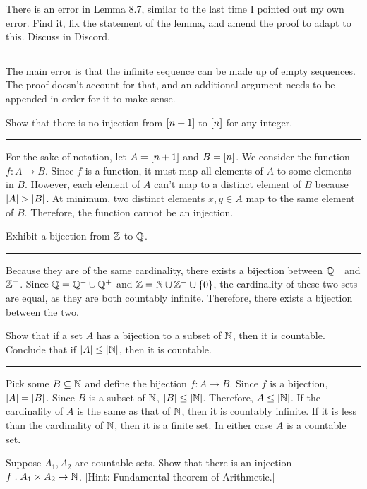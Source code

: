 \documentclass{article}
\begin{document}
\problem{}
There is an error in Lemma 8.7, similar to the last time I pointed out my own error.
Find it, fix the statement of the lemma, and amend the proof to adapt to this.
Discuss in Discord.

\hrule

The main error is that the infinite sequence can be made up of empty sequences.
The proof doesn't account for that, and an additional argument needs to be appended in order for it to make sense.

\problem{}

\subproblema{}

Show that there is no injection from $\left [ n+1 \right]$ to $\left [ n \right]$ for any integer.
\hrule

For the sake of notation, let $A = \left [ n+1 \right]$ and $B = \left [ n \right]$.
We consider the function $f : A \to B$.
Since $f$ is a function, it must map all elements of $A$ to some elements in $B$.
However, each element of $A$ can't map to a distinct element of $B$ because $\left\lvert A \right\rvert > \left\lvert B \right\rvert$.
At minimum, two distinct elements $x, y \in A$ map to the same element of $B$.
Therefore, the function cannot be an injection.

\problem{}

Exhibit a bijection from $\mathbb Z$ to $\mathbb Q$.

\hrule

Because they are of the same cardinality, there exists a bijection between $\mathbb Q^-$ and $\mathbb Z^-$.
Since $\mathbb Q = \mathbb Q^- \cup \mathbb Q^+$ and $\mathbb Z = \mathbb N \cup \mathbb Z^- \cup \left \{ 0 \right \}$, the cardinality of these two sets are equal, as they are both countably infinite.
Therefore, there exists a bijection between the two.

\problem{}

Show that if a set $A$ has a bijection to a subset of $\mathbb N$, then it is countable.
Conclude that if $\left\lvert A \right\rvert \leq \left\lvert\mathbb N \right\rvert$, then it is countable.

\hrule

Pick some $B \subseteq \mathbb N$ and define the bijection $f : A \to B$.
Since $f$ is a bijection, $\left\lvert A \right\rvert = \left\lvert B \right\rvert$.
Since $B$ is a subset of $\mathbb N$, $\left\lvert B \right\rvert \leq \left\lvert\mathbb N \right\rvert$.
Therefore, $A \leq \left\lvert\mathbb N \right\rvert$.
If the cardinality of $A$ is the same as that of $\mathbb N$, then it is countably infinite.
If it is less than the cardinality of $\mathbb N$, then it is a finite set.
In either case $A$ is a countable set.

\problem{}

\subproblema{}
Suppose $A_1, A_2$ are countable sets.
Show that there is an injection $f : A_1 \times A_2 \to \mathbb N$.
[Hint: Fundamental theorem of Arithmetic.]
\end{document}

